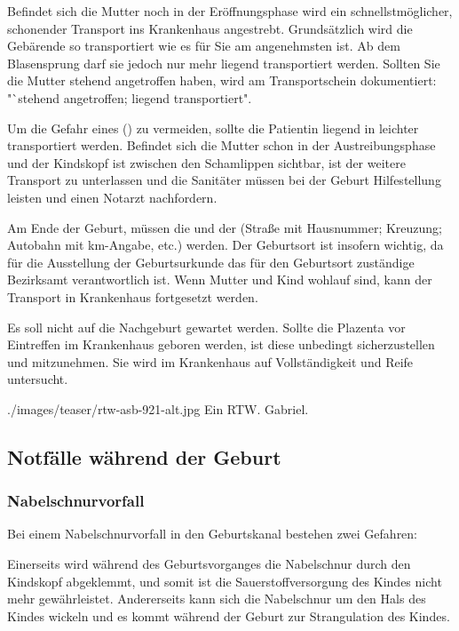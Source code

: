 {%
Befindet sich die Mutter noch in der Eröffnungsphase wird ein schnellstmöglicher,
schonender Transport ins Krankenhaus angestrebt. Grundsätzlich wird die Gebärende
so transportiert wie es für Sie am angenehmsten ist. Ab dem
Blasensprung darf sie jedoch nur mehr liegend transportiert werden. Sollten Sie die Mutter stehend
angetroffen haben, wird am Transportschein dokumentiert: "`stehend angetroffen;
liegend transportiert". 

Um die Gefahr eines 
() zu vermeiden, sollte die
Patientin liegend in leichter 
transportiert werden. Befindet sich die Mutter schon in der
Austreibungsphase und der Kindskopf ist zwischen den
Schamlippen sichtbar, ist der weitere Transport zu
unterlassen und die Sanitäter müssen bei der Geburt
Hilfestellung leisten und einen Notarzt nachfordern.

Am
Ende der Geburt, müssen die  und der
 (Straße mit Hausnummer; Kreuzung; Autobahn mit km-Angabe, etc.)  werden.
Der Geburtsort ist insofern wichtig, da für die Ausstellung der Geburtsurkunde  das für den
Geburtsort zuständige Bezirksamt verantwortlich ist. Wenn Mutter und Kind wohlauf
sind, kann der Transport in Krankenhaus fortgesetzt werden. 

Es soll nicht auf
die Nachgeburt gewartet werden. Sollte die Plazenta vor Eintreffen im
Krankenhaus geboren werden, ist diese unbedingt sicherzustellen und mitzunehmen.
Sie wird im Krankenhaus auf Vollständigkeit und Reife untersucht.
}
{}
{./images/teaser/rtw-asb-921-alt.jpg}
{Ein RTW.}
{Gabriel.}








\subsection{Notfälle während der Geburt}

\subsubsection{Nabelschnurvorfall}

Bei einem Nabelschnurvorfall in den Geburtskanal bestehen zwei Gefahren:

Einerseits wird während des Geburtsvorganges die Nabelschnur durch den
Kindskopf abgeklemmt, und somit ist die Sauerstoffversorgung des Kindes nicht mehr
gewährleistet. Andererseits kann sich die Nabelschnur  um den Hals
des Kindes wickeln und es kommt während der Geburt zur Strangulation des
Kindes.

